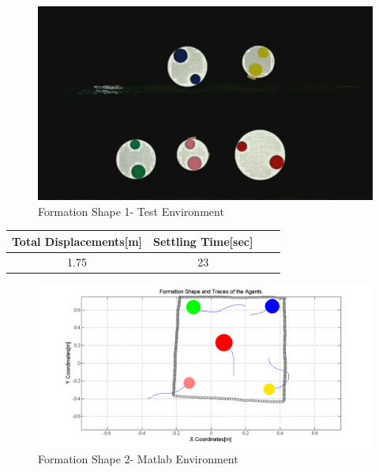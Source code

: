 \begin{figure}[H]
\caption{Formation Shape 1- Test Environment}
\centerline{\includegraphics[scale = 0.35]{2_real_hardware}}
\end{figure} 
					
\begin{center}
 \label{hardwareshape1_ref} 
\begin{tabular}{||c| c |c |c ||}
\hline
\textbf{Total Displacements[m]}  & \textbf{Settling Time[sec]}\\ 
\hline
1.75 & 23 \\
\hline
\end{tabular}
\end{center}
		
\begin{figure}[H]
\caption{Formation Shape 2- Matlab Environment}
\centerline{\includegraphics[scale = 0.45]{4_hardware}}
\end{figure} 
					
